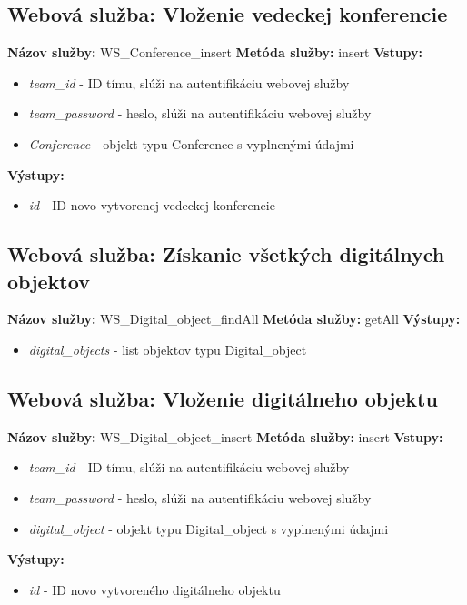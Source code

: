 \documentclass[10pt,oneside,slovak,a4paper]{article}
\begin{document}
\subsection{Webová služba: Vloženie vedeckej konferencie}
\textbf{Názov služby:} WS\_Conference\_insert
\textbf{Metóda služby:} insert
\textbf{Vstupy:}
	\begin{itemize}
		\item \textit{team\_id} - ID tímu, slúži na autentifikáciu webovej služby
		\item \textit{team\_password} - heslo, slúži na autentifikáciu webovej služby
		\item \textit{Conference} - objekt typu Conference s vyplnenými údajmi
	\end{itemize}
\textbf{Výstupy:}
	\begin{itemize}
		\item \textit{id} - ID novo vytvorenej vedeckej konferencie
	\end{itemize}
	
\subsection{Webová služba: Získanie všetkých digitálnych objektov}
\textbf{Názov služby:} WS\_Digital\_object\_findAll
\textbf{Metóda služby:} getAll
\textbf{Výstupy:}
	\begin{itemize}
		\item \textit{digital\_objects} - list objektov typu Digital\_object
	\end{itemize}
	
\subsection{Webová služba: Vloženie digitálneho objektu}
\textbf{Názov služby:} WS\_Digital\_object\_insert
\textbf{Metóda služby:} insert
\textbf{Vstupy:}
	\begin{itemize}
		\item \textit{team\_id} - ID tímu, slúži na autentifikáciu webovej služby
		\item \textit{team\_password} - heslo, slúži na autentifikáciu webovej služby
		\item \textit{digital\_object} - objekt typu Digital\_object s vyplnenými údajmi
	\end{itemize}
\textbf{Výstupy:}
	\begin{itemize}
		\item \textit{id} - ID novo vytvoreného digitálneho objektu
	\end{itemize}
	
\end{document}
